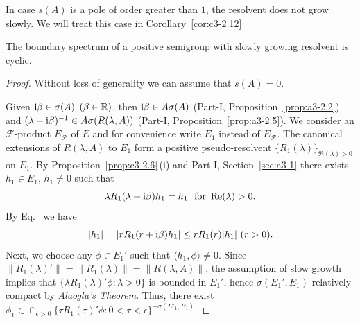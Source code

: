 In case $s(A)$ is a pole of order greater than $1$, the resolvent does not grow slowly.
We will treat this case in Corollary~\ref{cor:c3-2.12}
\begin{theorem}\label{thm:c3-2.10}
	The boundary spectrum of a positive semigroup with slowly growing resolvent is cyclic.
\end{theorem}
\begin{proof}
Without loss of generality we can assume that $s(A) = 0$.

Given $\mathrm{i}\beta \in \sigma(A)$ $(\beta \in \mathbb{R} )$, then $\mathrm{i}\beta \in A\sigma(A)$ (Part-I, Proposition~\ref{prop:a3-2.2}) and $(\lambda-\mathrm{i}\beta)^{-1} \in A\sigma(R(\lambda,A))$ (Part-I, Proposition~\ref{prop:a3-2.5}).
We consider an $\mathcal{F}$-product $E_{\mathcal{F}}$ of\/ $E$ and for convenience write $E_{1}$ instead of\/ $E_{\mathcal{F}}$.
The canonical extensions of\/ $R(\lambda,A)$ to $E_{1}$ form a positive pseudo-resolvent $\{R_{1}(\lambda)\}_{\Re(\lambda)>0}$ on $E_{1}$.
By Proposition~\ref{prop:c3-2.6}\,(i) and Part-I, Section~\ref{sec:a3-1} there exists $h_{1} \in E_{1}$, $h_{1} \neq 0$ such that
\begin{equation}\label{eq:c3-2.16}
	\lambda R_{1}(\lambda+\mathrm{i}\beta)h_{1} = h_{1} \ \text{ for }  \mathop{}\!\mathrm{Re}(\lambda) > 0 .
\end{equation}
By Eq.~ we have
\begin{equation}\label{eq:c3-2.17}%
	|h_{1}| = |r R_{1}(r+\im\beta)h_{1}| \leq r R_{1}(r)|h_{1}| \ (r > 0) .
\end{equation}
Next, we choose any $\phi \in E_{1}'$ such that $\langle  h_{1},\phi \rangle \neq 0$.
Since $\|R_{1}(\lambda)'\| = \|R_{1}(\lambda)\| = \|R(\lambda,A)\|$, the assumption of slow growth implies that $\{\lambda R_{1}(\lambda)'\phi \colon \lambda > 0\}$ is bounded in $E_{1}'$, hence $\sigma(E_{1}',E_{1})$-relatively compact by \emph{Alaoglu's Theorem}.
Thus, there exist $\phi_{1} \in \cap_{\epsilon>0}\{\tau R_{1}(\tau)'\phi \colon 0<\tau<\epsilon\}^{-\sigma(E'_1,E_1)}$.


\end{proof}
